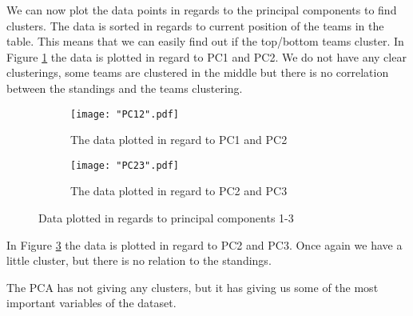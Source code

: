 \documentclass[Report.tex]{subfiles}
\begin{document}
We can now plot the data points in regards to the principal components to find clusters. The data is sorted in regards to current position of the teams in the table. This means that we can easily find out if the top/bottom teams cluster. In Figure \ref{fig:PC12} the data is plotted in regard to PC1 and PC2. We do not have any clear clusterings, some teams are clustered in the middle but there is no correlation between the standings and the teams clustering.

\begin{figure}
\center
\begin{subfigure}[b]{0.49\textwidth}
\texttt{[image: "PC12".pdf]}
\caption{The data plotted in regard to PC1 and PC2}
\label{fig:PC12}
\end{subfigure}
\begin{subfigure}[b]{0.49\textwidth}
\texttt{[image: "PC23".pdf]}
\caption{The data plotted in regard to PC2 and PC3}
\label{fig:PC23}
\end{subfigure}
\caption{Data plotted in regards to principal components 1-3}

\end{figure}
In Figure \ref{fig:PC23} the data is plotted in regard to PC2 and PC3. Once again we have a little cluster, but there is no relation to the standings.

The PCA has not giving any clusters, but it has giving us some of the most important variables of the dataset. 
\end{document}
